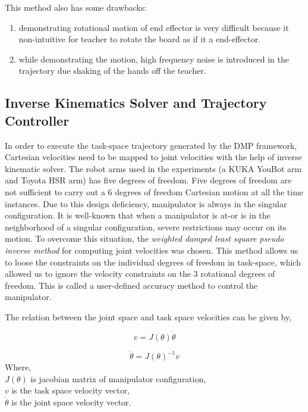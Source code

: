 This method also has some drawbacks:

\begin{enumerate}
	\item demonstrating rotational motion of end effector is very difficult because it non-intuitive for teacher to rotate the board as if it a end-effector.
	\item while demonstrating the motion, high frequency noise is introduced in the trajectory due shaking of the hands off the teacher.
\end{enumerate}

\subsection{Inverse Kinematics Solver and Trajectory Controller}\label{IK}

In order to execute the task-space trajectory generated by the DMP framework, Cartesian velocities need to be mapped to joint velocities with the help of inverse kinematic solver. The robot arms used in the experiments (a KUKA YouBot arm and Toyota HSR arm) has five degrees of freedom. Five degrees of freedom are not sufficient to carry out a 6 degrees of freedom Cartesian motion at all the time instances. Due to this design deficiency, manipulator is always in the singular configuration. It is well-known that when a manipulator is at-or is in the neighborhood of a singular configuration, severe restrictions may occur on its motion. To overcome this situation, the \textit{weighted damped least square pseudo inverse method} for computing joint velocities was chosen. This method allows us to loose the constraints on the individual degrees of freedom in task-space, which allowed us to ignore the velocity constraints on the 3 rotational degrees of freedom. This is called a user-defined accuracy method to control the manipulator. \cite{chiaverini1994review}


The relation between the joint space and task space velocities can be given by, 

\begin{equation}\label{theta_dot}
	v = J(\theta) \dot{\theta} 
\end{equation}

\begin{equation}\label{theta_dot_inv}
	\dot{\theta} = J(\theta)^{-1}  v
\end{equation} 
Where, \\
$J(\theta)$ is jacobian matrix of manipulator configuration, \\
$v$ is the task space velocity vector, \\
$\dot{\theta}$ is the joint space velocity vector. \\

